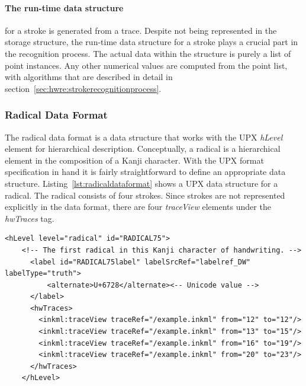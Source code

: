 \paragraph{The run-time data structure} for a stroke is generated from a trace.
Despite not being represented in the storage structure, the run-time data
structure for a stroke plays a crucial part in the recognition process.
The actual data within the structure is purely a list of point instances. 
Any other numerical values are computed from the point list, with algorithms
that are described in detail in 
section~\ref{sec:hwre:strokerecognitionprocess}.

\subsubsection{Radical Data Format}
\label{sec:hwre:radicaldataformat}

The radical data format is a data structure that works with the UPX \emph{hLevel}
element for hierarchical description.
Conceptually, a radical is a hierarchical element in the composition of a Kanji
character. With the UPX format specification in hand it is fairly 
straightforward to define an appropriate data structure.
Listing~\ref{lst:radicaldataformat} shows a UPX data structure for a radical.
The radical  consists of four strokes.
Since strokes are not represented explicitly in the data format,
there are four \emph{traceView} elements under the \emph{hwTraces} tag.
\begin{xmlcode}
  \begin{lstlisting}[emph={hLevel,hwTraces,label,alternative},
                     emphstyle=\color{blue}\textbf,
                     emph={[2]level,labelSrcRef,labelType,traceRef,from,to},
                     emphstyle={[2]\color{red}},
                     caption={A radical representation in UPX},
                     label=lst:radicaldataformat]
    <hLevel level="radical" id="RADICAL75">
    <!-- The first radical in this Kanji character of handwriting. -->
      <label id="RADICAL75label" labelSrcRef="labelref_DW" labelType="truth">
          <alternate>U+6728</alternate><-- Unicode value -->
      </label>
      <hwTraces>
        <inkml:traceView traceRef="/example.inkml" from="12" to="12"/>
        <inkml:traceView traceRef="/example.inkml" from="13" to="15"/>
        <inkml:traceView traceRef="/example.inkml" from="16" to="19"/>
        <inkml:traceView traceRef="/example.inkml" from="20" to="23"/>
      </hwTraces>
    </hLevel>
  \end{lstlisting}
\end{xmlcode}

